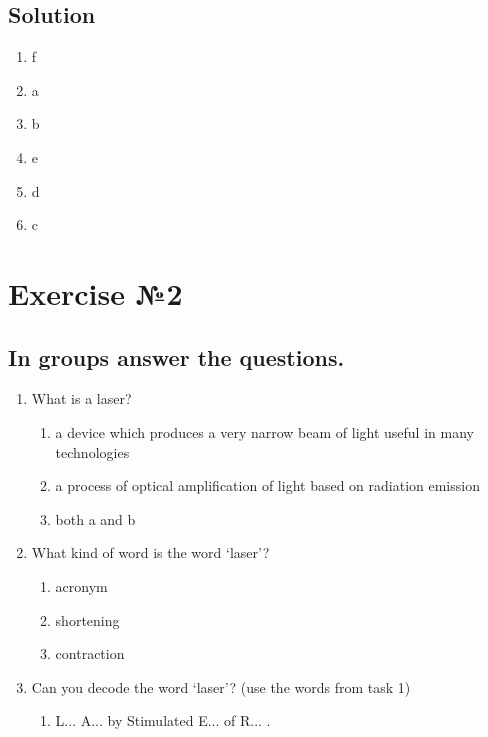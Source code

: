 \documentclass[12pt, a4paper]{report}
\begin{document}
\subsection*{Solution}
\begin{enumerate}
    \item f
    \item a
    \item b
    \item e
    \item d
    \item c
\end{enumerate} \leavevmode\newline

\section{Exercise №2}

\subsection*{In groups answer the questions.}
\begin{enumerate}
    \item What is a laser?
          \begin{enumerate}
              \item a device which produces a very narrow beam of light useful in
                    many technologies
              \item a process of optical amplification of light based on
                    radiation emission
              \item both a and b
          \end{enumerate}
    \item What kind of word is the word ‘laser’?
          \begin{enumerate}
              \item acronym
              \item shortening
              \item contraction
          \end{enumerate}
    \item Can you decode the word ‘laser’? (use the words from task 1)
          \begin{enumerate}
              \item[] L... A... by Stimulated E... of R... .
          \end{enumerate}
\end{enumerate}
\end{document}

